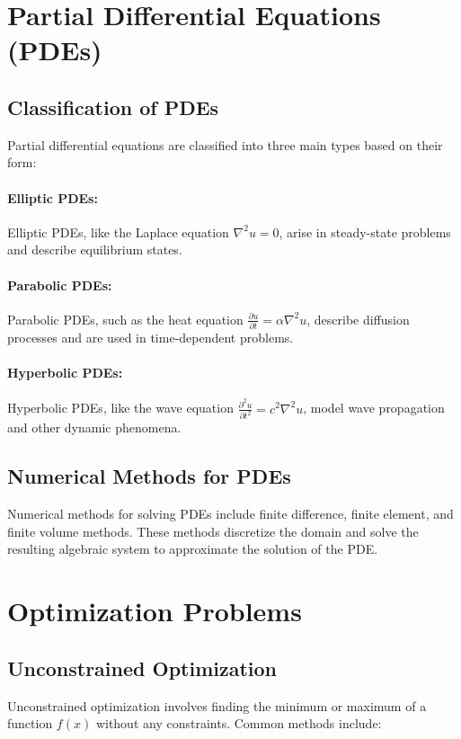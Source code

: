 \documentclass[12pt]{article}
\begin{document}
\section{Partial Differential Equations (PDEs)}
\subsection{Classification of PDEs}
Partial differential equations are classified into three main types based on their form:

\paragraph{Elliptic PDEs:}
Elliptic PDEs, like the Laplace equation \( \nabla^2 u = 0 \), arise in steady-state problems and describe equilibrium states.

\paragraph{Parabolic PDEs:}
Parabolic PDEs, such as the heat equation \( \frac{\partial u}{\partial t} = \alpha \nabla^2 u \), describe diffusion processes and are used in time-dependent problems.

\paragraph{Hyperbolic PDEs:}
Hyperbolic PDEs, like the wave equation \( \frac{\partial^2 u}{\partial t^2} = c^2 \nabla^2 u \), model wave propagation and other dynamic phenomena.

\subsection{Numerical Methods for PDEs}
Numerical methods for solving PDEs include finite difference, finite element, and finite volume methods. These methods discretize the domain and solve the resulting algebraic system to approximate the solution of the PDE.

\section{Optimization Problems}
\subsection{Unconstrained Optimization}
Unconstrained optimization involves finding the minimum or maximum of a function \( f(x) \) without any constraints. Common methods include:
\end{document}
